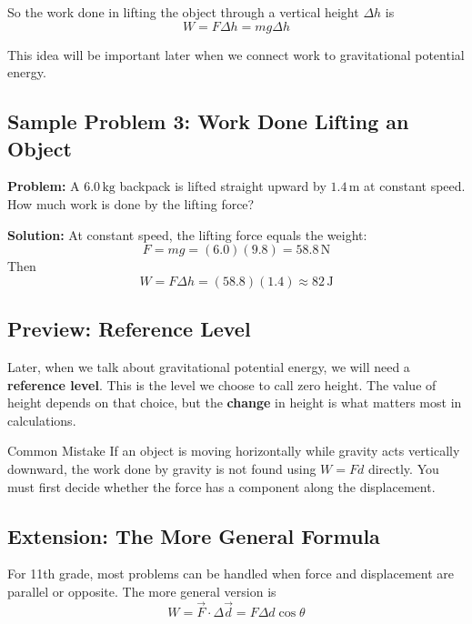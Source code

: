 So the work done in lifting the object through a vertical height $\Delta h$ is
\begin{equation}
    W = F \Delta h = mg \Delta h
\end{equation}

This idea will be important later when we connect work to gravitational potential energy.

\subsection*{Sample Problem 3: Work Done Lifting an Object}
\textbf{Problem:} A $6.0\,\text{kg}$ backpack is lifted straight upward by $1.4\,\text{m}$ at constant speed. How much work is done by the lifting force?

\textbf{Solution:}
At constant speed, the lifting force equals the weight:
\begin{equation*}
    F = mg = (6.0)(9.8) = 58.8\,\text{N}
\end{equation*}
Then
\begin{equation*}
    W = F \Delta h = (58.8)(1.4) \approx 82\,\text{J}
\end{equation*}

\subsection{Preview: Reference Level}
Later, when we talk about gravitational potential energy, we will need a \textbf{reference level}. This is the level we choose to call zero height. The value of height depends on that choice, but the \textbf{change} in height is what matters most in calculations.

\begin{pitfall}{Common Mistake}
If an object is moving horizontally while gravity acts vertically downward, the work done by gravity is not found using $W = Fd$ directly. You must first decide whether the force has a component along the displacement.
\end{pitfall}

\subsection{Extension: The More General Formula}
For 11th grade, most problems can be handled when force and displacement are parallel or opposite. The more general version is
\begin{equation}
    W = \vec{F} \cdot \Delta \vec{d} = F \Delta d \cos \theta
\end{equation}

